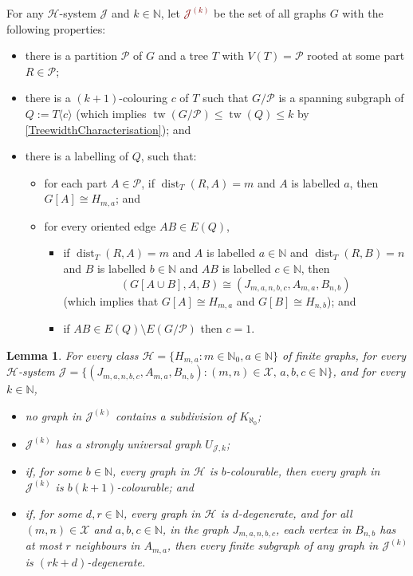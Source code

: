 \documentclass[a4paper,11pt]{article}
\newcommand{\defn}[1]{\textcolor{Maroon}{\emph{#1}}\index{#1}}
\theoremstyle{plain}
\newtheorem{lem}[thm]{Lemma}
\theoremstyle{definition}
\renewcommand{\leq}{\leqslant}
\DeclareMathOperator{\tw}{tw}
\DeclareMathOperator{\dist}{dist}
\newcommand{\XX}{\mathcal{X}}
\newcommand{\HH}{\mathcal{H}}
\newcommand{\JJ}{\mathcal{J}}
\newcommand{\NN}{\mathbb{N}}
\newcommand{\PART}{\mathcal{P}}
\newcommand{\GGG}[2]{#1\langle{#2}\rangle}
\begin{document}
For any $\HH$-system $\JJ$ and $k\in\NN$, let \defn{$\JJ^{(k)}$} be the set of all graphs $G$ with the following properties:
\begin{itemize}
\item there is a partition $\PART$ of $G$ and a  tree $T$ with $V(T)=\PART$ rooted at some part $R\in\PART$; 
\item there is a $(k+1)$-colouring $c$ of $T$ such that $G/\PART$ is a spanning subgraph of $Q:=\GGG{T}{c}$ (which implies $\tw(G/\PART)\leq \tw(Q) \leq k$ by \cref{TreewidthCharacterisation}); and
\item there is a labelling of $Q$, such that:
\begin{itemize}
\item for each part $A\in\PART$, 
if $\dist_T(R,A)=m$ and $A$ is labelled $a$, then $G[A]\cong H_{m,a}$; and
\item for every oriented edge $AB\in E(Q)$, 
\begin{itemize}
\item if $\dist_T(R,A)=m$ and $A$ is labelled $a\in\NN$ and $\dist_T(R,B)=n$ and $B$ is labelled $b\in\NN$ and $AB$ is labelled $c\in\NN$, then $$(G[A\cup B],A,B)\cong (J_{m,a,n,b,c},A_{m,a},B_{n,b})$$ 
(which implies that $G[A]\cong H_{m,a}$ and $G[B]\cong H_{n,b}$); and
\item if $AB\in E(Q)\setminus E(G/\PART)$ then $c=1$. 
\end{itemize}
\end{itemize}
\end{itemize}

\begin{lem}
\label{JJJ}
For every class $\HH=\{H_{m,a}:m\in\NN_0,a\in\NN\}$ of finite graphs, for every $\HH$-system $\JJ=\{ (J_{m,a,n,b,c},A_{m,a},B_{n,b}) :(m,n)\in\XX,\,a,b,c\in\NN\}$, and for every $k\in\NN$, 
\begin{itemize}
\item no graph in $\JJ^{(k)}$ contains a subdivision of $K_{\aleph_0}$;
\item $\JJ^{(k)}$ has a strongly universal graph $U_{\JJ,k}$;
\item if, for some $b\in\NN$, every graph in $\HH$ is $b$-colourable, then every graph in $\JJ^{(k)}$ is $b(k+1)$-colourable; and
\item if, for some $d,r\in \NN$, every graph in $\HH$ is $d$-degenerate, and for all $(m,n)\in\XX$ and $a,b,c\in\NN$, in the graph $J_{m,a,n,b,c}$, each vertex in $B_{n,b}$ has at most $r$ neighbours in $A_{m,a}$, then every finite subgraph of any graph in $\JJ^{(k)}$ is $(rk+d)$-degenerate.
\end{itemize}
\end{lem}
\end{document}
